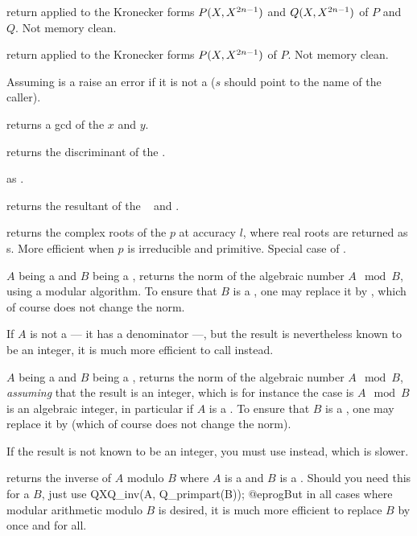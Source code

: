  return 
applied to the Kronecker forms $P(X,X^{2\*n-1})$ and $Q(X,X^{2\*n-1})$
of $P$ and $Q$. Not memory clean.

 return 
applied to the Kronecker forms $P(X,X^{2\*n-1})$
of $P$. Not memory clean.


 Assuming  is a 
raise an error if it is not a  ($s$ should point to the name of the
caller).

 returns a gcd of the  $x$ and $y$.

 returns the discriminant of the 
.

 as .

 returns the resultant of the
~ and .

 returns the complex roots of the
 $p$ at accuracy $l$, where real roots are returned as s.
More efficient when $p$ is irreducible and primitive. Special case
of .


 $A$ being a  and $B$ being a
, returns the norm of the algebraic number $A \mod B$, using a
modular algorithm. To ensure that $B$ is a , one may replace it by
, which of course does not change the norm.

If $A$ is not a  --- it has a denominator ---, but the result is
nevertheless known to be an integer, it is much more efficient to call
 instead.

 $A$ being a  and $B$
being a , returns the norm of the algebraic number $A \mod B$,
\emph{assuming} that the result is an integer, which is for instance the case
is $A\mod B$ is an algebraic integer, in particular if $A$ is a . To
ensure that $B$ is a , one may replace it by 
(which of course does not change the norm).

If the result is not known to be an integer, you must use 
instead, which is slower.

 returns the inverse of $A$ modulo $B$
where $A$ is a  and $B$ is a . Should you need this for
a  $B$, just use
\bprog
  QXQ_inv(A, Q_primpart(B));
@eprog\noindent But in all cases where modular arithmetic modulo $B$ is
desired, it is much more efficient to replace $B$ by 
once and for all.

